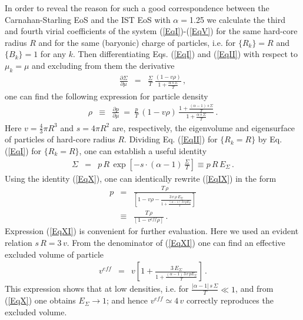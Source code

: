 \documentclass[12pt]{article}
\begin{document}
In order to reveal the reason for such a good correspondence between the Carnahan-Starling EoS and the IST EoS with 
$\alpha=$1.25 we   calculate the third and fourth virial coefficients of the system  (\ref{EqI})-(\ref{EqV}) for the same hard-core radius $R$ and for the same (baryonic) charge of particles, i.e. for  $\{R_k\} =R$  and $\{B_k\} =1$ for any $k$.  Then differentiating Eqs. (\ref{EqI}) and (\ref{EqII}) with respect to 
$\mu_k = \mu$ and excluding from them the derivative
%
\begin{eqnarray}\label{EqVIII}
\frac{\partial \Sigma}{\partial \mu} &=&  \frac{\Sigma}{T} \,  \frac{(1 - v \rho)}{1 + \frac{\alpha\, s\, \Sigma}{T}} \,,
\end{eqnarray}
%
one can find the following expression for particle density 
%
\begin{eqnarray}\label{EqIX}
\rho & \equiv & \frac{\partial p}{\partial \mu} ~=~  \frac{p}{T} \, (1 - v \rho)  \, 
\frac{1 + \frac{(\alpha-1)\, s\, \Sigma}{T}}{1 + \frac{\alpha\, s\, \Sigma}{T}}
 \,.
\end{eqnarray}
%
Here $v = \frac{4}{3}\pi R^3$ and $s = 4\pi R^2 $ are, respectively, the eigenvolume and eigensurface of particles of hard-core radius $R$.  Dividing Eq. (\ref{EqII}) for $\{R_k=R\}$ by Eq. (\ref{EqI}) for $\{R_k=R\}$, one can establish  a useful identity
%
\begin{eqnarray}
\label{EqX}
%
\Sigma  & =   &  p \, R  \, \exp \left[ - s \cdot (\alpha-1)\, \frac{\Sigma}{T} \right] \equiv p \, R \, E_\Sigma \, . 
%
\end{eqnarray}
%
Using  the identity  (\ref{EqX}), one can identically rewrite  (\ref{EqIX}) in the form 
%
\begin{eqnarray}\label{EqXI}
p & = &   \frac{T \,\rho}{\left[  1 - v \rho -  \frac{3\, v\, \rho \, E_\Sigma }{1 + \frac{\left(\alpha-1 \right)\, 3\, v \, p E_\Sigma}{T} } 
\right]} \\
\label{EqXII}
&\equiv  &  \frac{T \,\rho}{\left[  1 - v^{eff} \rho \right]} \, .
\end{eqnarray}
%
Expression  (\ref{EqXI})  is  convenient for further evaluation.  Here we used an evident relation $s \, R = 3 \, v$.  From the denominator of  (\ref{EqXI})  one can find an effective excluded volume of particle
%
\begin{eqnarray}
\label{EqXIII}
%
v^{eff}   & =   & v  \left[1 +   \frac{3\,  E_\Sigma }{1 + \frac{\left(\alpha-1 \right)\, 3\, v \, p E_\Sigma}{T}}  \right] \,.
%
\end{eqnarray}
%
This expression shows that at low densities, i.e. for  $\frac{|\alpha-1| \, s\, \Sigma }{T} \ll 1$, and from (\ref{EqX})  one obtains  $E_\Sigma \rightarrow 1$; and hence  $v^{eff} \simeq 4 \,v$   correctly reproduces the excluded volume.  
\end{document}
